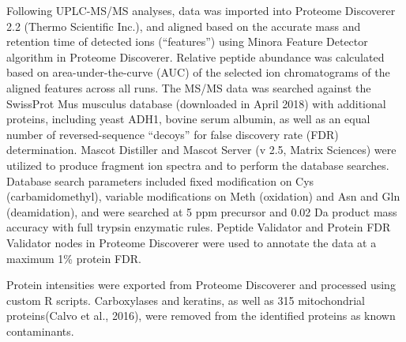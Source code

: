 Following UPLC-MS/MS analyses, data was imported into Proteome Discoverer 2.2
(Thermo Scientific Inc.), and aligned based on the accurate mass and retention
time of detected ions (“features”) using Minora Feature Detector algorithm in
Proteome Discoverer. Relative peptide abundance was calculated based on
area-under-the-curve (AUC) of the selected ion chromatograms of the aligned
features across all runs. The MS/MS data was searched against the SwissProt Mus
musculus database (downloaded in April 2018) with additional proteins, including
yeast ADH1, bovine serum albumin, as well as an equal number of
reversed-sequence “decoys” for false discovery rate (FDR) determination. Mascot
Distiller and Mascot Server (v 2.5, Matrix Sciences) were utilized to produce
fragment ion spectra and to perform the database searches. Database search
parameters included fixed modification on Cys (carbamidomethyl), variable
modifications on Meth (oxidation) and Asn and Gln (deamidation), and were
searched at 5 ppm precursor and 0.02 Da product mass accuracy with full trypsin
enzymatic rules. Peptide Validator and Protein FDR Validator nodes in Proteome
Discoverer were used to annotate the data at a maximum 1\% protein FDR.

Protein intensities were exported from Proteome Discoverer and processed using
custom R scripts. Carboxylases and keratins, as well as 315 mitochondrial
proteins(Calvo et al., 2016), were removed from the identified proteins as known
contaminants.

